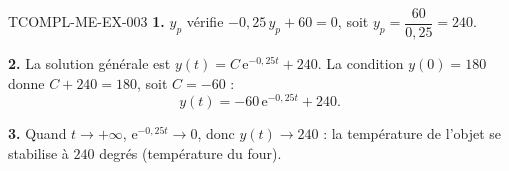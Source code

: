 \begin{corrige}{TCOMPL-ME-EX-003}
\textbf{1.} $y_p$ vérifie $-0{,}25\,y_p+60=0$, soit $y_p = \dfrac{60}{0{,}25} = 240$.

\textbf{2.} La solution générale est $y(t) = C\,\mathrm{e}^{-0{,}25t} + 240$. La condition $y(0)=180$ donne $C+240=180$, soit $C=-60$ :
\[
  y(t) = -60\,\mathrm{e}^{-0{,}25t} + 240.
\]

\textbf{3.} Quand $t\to+\infty$, $\mathrm{e}^{-0{,}25t}\to0$, donc $y(t) \to 240$ : la température de l'objet se stabilise à $240$ degrés (température du four).
\end{corrige}
